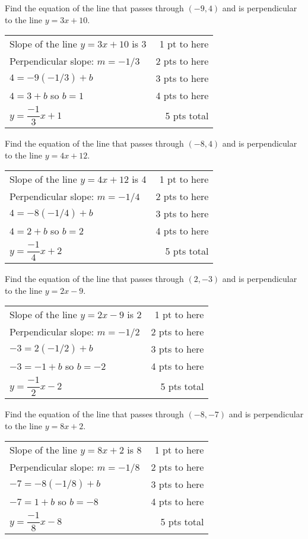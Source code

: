 {
	Find the equation of the line that passes through $(-9,4)$ and is perpendicular to the line $y=3x+10$.
}
{
	\begin{tabular}{l r}
	Slope of the line $y=3x+10$ is 3 & 1 pt to here \\
	Perpendicular slope:  $m= -1/3$ & 2 pts to here\\
	$4 = -9(-1/3) + b$  & 3 pts to here\\   
	$4 =  3 + b$ so $b = 1$ & 4 pts to here \\
	$y=\dfrac{-1}{3} x+1$ & 5 pts total
	\end{tabular}
}

{
	Find the equation of the line that passes through $(-8,4)$ and is perpendicular to the line $y=4x+12$.
}
{
	\begin{tabular}{l r}
	Slope of the line $y=4x+12$ is 4 & 1 pt to here \\
	Perpendicular slope: $m= -1/4$ & 2 pts to here\\
	$4 = -8(-1/4) + b$ &  3 pts to here\\
	$4 =  2 + b$ so $b = 2$ & 4 pts to here\\
	$y=\dfrac{-1}{4} x+2$     & 5 pts total\\
	\end{tabular}
}

{
	Find the equation of the line that passes through $(2,-3)$ and is perpendicular to the line $y=2x-9$.
}
{
	\begin{tabular}{l r}
	Slope of the line $y=2x-9$ is 2 & 1 pt to here \\
	Perpendicular slope: $m= -1/2$ & 2 pts to here\\
	$-3 = 2(-1/2) + b$ &  3 pts to here\\
	$-3=  -1 + b$ so $b = -2$ & 4 pts to here\\
	$y=\dfrac{-1}{2} x-2$     & 5 pts total\\
	\end{tabular}
}

{
	Find the equation of the line that passes through $(-8,-7)$ and is perpendicular to the line $y=8x+2$.
}
{
	\begin{tabular}{l r}
	Slope of the line $y=8x+2$ is $8$ & 1 pt to here \\
	Perpendicular slope: $m=-1/8$ & 2 pts to here\\
	$-7 = -8(-1/8) + b$ &  3 pts to here\\
	$-7=  1 + b$ so $b = -8$ & 4 pts to here\\
	$y=\dfrac{-1}{8}x-8$     & 5 pts total\\
	\end{tabular}
}
